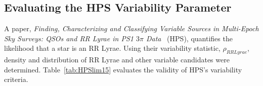 \documentclass[aps,prb,twocolumn,superscriptaddress]{revtex4-1}
\begin{document}



\subsection{Evaluating the HPS Variability Parameter}\label{sec:HPS}

A paper, \textit{Finding, Characterizing and Classifying Variable Sources in Multi-Epoch Sky Surveys: QSOs and RR Lyrae in PS1 $3\pi$ Data}~\cite{PSdata} (HPS), quantifies the likelihood that a star is an RR Lyrae.  Using their variability statistic, $\rho_{RRLyrae}$, density and distribution of RR Lyrae and other variable candidates were determined.  Table~\ref{tab:HPSlim15} evaluates the validity of HPS's variability criteria.
\end{document}
